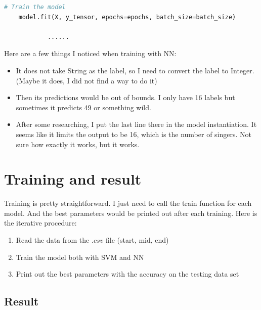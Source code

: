 \documentclass[letterpaper,12pt]{article}
\begin{document}
\begin{itemize}
\begin{lstlisting}[language=Python]
    # Train the model
    model.fit(X, y_tensor, epochs=epochs, batch_size=batch_size)

            ......
    \end{lstlisting}
          Here are a few things I noticed when training with NN:\begin{itemize}
              \item It does not take String as the label, so I need to convert the label to Integer. (Maybe it does, I did not find a way to do it)
              \item Then its predictions would be out of bounds. I only have 16 labels but sometimes it predicts 49 or something wild.
              \item After some researching, I put the last line there in the model instantiation. It seems like it limits the output to be 16, which is the number of singers. Not sure how exactly it works, but it works.
          \end{itemize}
\end{itemize}
\section{Training and result}
Training is pretty straightforward. I just need to call the train function for each model. And the best parameters would be printed out after each training. Here is the iterative procedure:\begin{enumerate}
    \item Read the data from the $.csv$ file (start, mid, end)
    \item Train the model both with SVM and NN
    \item Print out the best parameters with the accuracy on the testing data set
\end{enumerate}
\subsection{Result}
\end{document}
